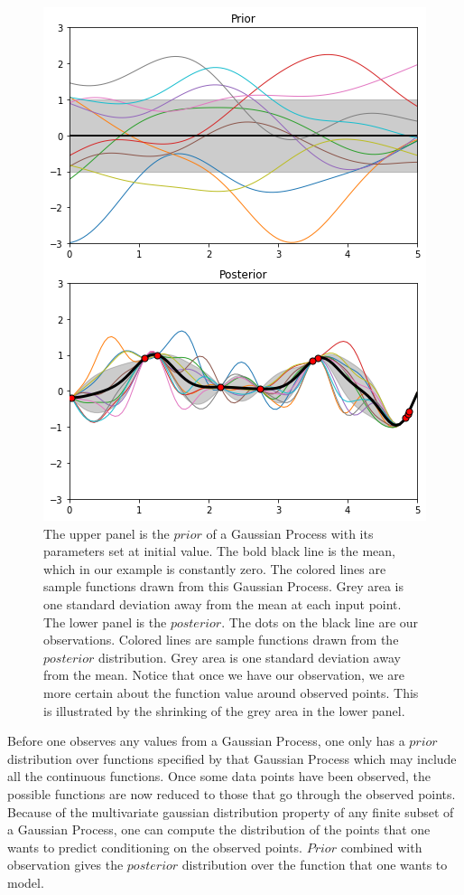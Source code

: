 \documentclass[11pt,a4paper]{article}
\theoremstyle{definition}
\numberwithin{equation}{section}
\begin{document}
	\begin{figure}[h!]
		\centering
		\includegraphics[width=0.6\linewidth]{gp.png}
		\caption{The upper panel is the $prior$ of a Gaussian Process with its parameters set at initial value. The bold black line is the mean, which in our example is constantly zero. The colored lines are sample functions drawn from this Gaussian Process. Grey area is one standard deviation away from the mean at each input point. The lower panel is the $posterior$. The dots on the black line are our observations. Colored lines are sample functions drawn from the $posterior$ distribution. Grey area is one standard deviation away from the mean. Notice that once we have our observation, we are more certain about the function value around observed points. This is illustrated by the shrinking of the grey area in the lower panel.}
		\label{fig:gp}
	\end{figure}
	
	Before one observes any values from a Gaussian Process, one only has a $prior$ distribution over functions specified by that Gaussian Process which may include all the continuous functions. Once some data points have been observed, the possible functions are now reduced to those that go through the observed points. Because of the multivariate gaussian distribution property of any finite subset of a Gaussian Process, one can compute the distribution of the points that one wants to predict conditioning on the observed points. $Prior$ combined with observation gives the $posterior$ distribution over the function that one wants to model.
	
\end{document}

